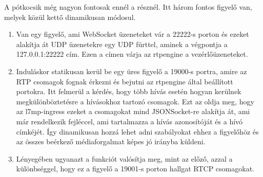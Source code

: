 A pótkocsik még nagyon fontosak ennél a résznél. Itt három fontos figyelő van, melyek közül
kettő dinamikusan módosul.

\begin{enumerate}
	\item Van egy figyelő, ami WebSocket üzeneteket vár a 22222-s porton és ezeket alakítja át
	UDP üzenetekre egy UDP fürttel, aminek a végpontja a 127.0.0.1:22222 cím. Ezen a címen várja
	az rtpengine a vezérlőüzeneteket. 
	\item Induláskor statikusan kerül be egy üres figyelő a 19000-s portra, amire az RTP csomagok
	fognak érkezni és bejutni az rtpengine által beállított portokra. Itt felmerül a kérdés, hogy 
	több hívás esetén hogyan kerülnek megkülönböztetésre a hívásokhoz tartozó csomagok. Ezt az
	oldja meg, hogy az l7mp-ingress ezeket a csomagokat mind JSONSocket-re alakítja át, ami már 
	rendelkezik fejléccel, ami tartalmazza a hívás azonosítóját és a hívó címkéjét. Így dinamikusan
	hozzá lehet adni szabályokat ehhez a figyelőhöz és az összes beérkező médiaforgalmat képes jó
	irányba küldeni. 
	\item Lényegében ugyanazt a funkciót valósítja meg, mint az előző, azzal a különbséggel, hogy
	ez a figyelő a 19001-s porton hallgat RTCP csomagokat. 
\end{enumerate}


 
